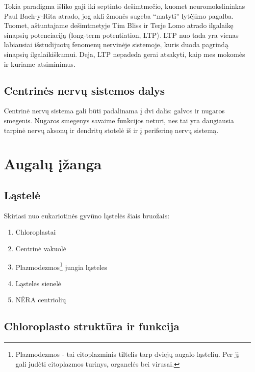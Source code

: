 \documentclass[]{book}
\providecommand{\tightlist}{%
  \setlength{\itemsep}{0pt}\setlength{\parskip}{0pt}}
\let\rmarkdownfootnote\footnote%
\def\footnote{\protect\rmarkdownfootnote}
\begin{document}
Tokia paradigma išliko gaji iki septinto dešimtmečio, kuomet neuromokslininkas Paul Bach-y-Rita atrado, jog akli žmonės sugeba ``matyti'' lytėjimo pagalba. Tuomet, aštuntajame dešimtmetyje Tim Bliss ir Terje Lomo atrado ilgalaikę sinapsių potenciaciją (long-term potentiation, LTP). LTP nuo tada yra vienas labiausiai išstudijuotų fenomenų nervinėje sistemoje, kuris duoda pagrindą sinapsių ilgalaikiškumui. Deja, LTP nepadeda gerai atsakyti, kaip mes mokomės ir kuriame atsiminimus.

\hypertarget{centrines-nervu-sistemos-dalys}{%
\section{Centrinės nervų sistemos dalys}\label{centrines-nervu-sistemos-dalys}}

Centrinė nervų sistema gali būti padalinama į dvi dalis: galvos ir nugaros smegenis. Nugaros smegenys savaime funkcijos neturi, nes tai yra daugiausia tarpinė nervų aksonų ir dendritų stotelė iš ir į periferinę nervų sistemą.

\hypertarget{augalu-izanga}{%
\chapter{Augalų įžanga}\label{augalu-izanga}}

\hypertarget{lastele}{%
\section{Ląstelė}\label{lastele}}

Skiriasi nuo eukariotinės gyvūno ląstelės šiais bruožais:

\begin{enumerate}
\def\labelenumi{\arabic{enumi}.}
\tightlist
\item
  Chloroplastai
\item
  Centrinė vakuolė
\item
  Plazmodezmos\footnote{Plazmodezmos - tai citoplazminis tiltelis tarp dviejų augalo ląstelių. Per jį gali judėti citoplazmos turinys, organelės bei virusai.} jungia ląsteles
\item
  Ląstelės sienelė
\item
  NĖRA centriolių
\end{enumerate}

\hypertarget{chloroplasto-struktura-ir-funkcija}{%
\section{Chloroplasto struktūra ir funkcija}\label{chloroplasto-struktura-ir-funkcija}}
\end{document}
